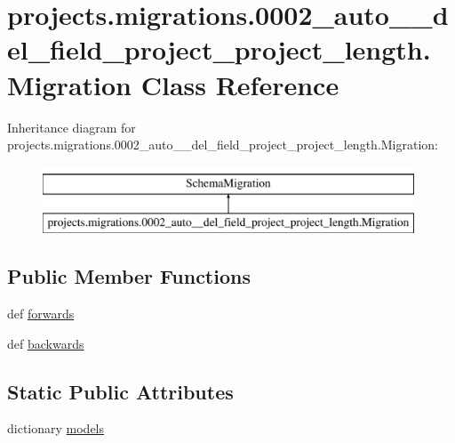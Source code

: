\hypertarget{classprojects_1_1migrations_1_10002__auto____del__field__project__project__length_1_1_migration}{\section{projects.\-migrations.0002\-\_\-auto\-\_\-\-\_\-del\-\_\-field\-\_\-project\-\_\-project\-\_\-length.Migration Class Reference}
\label{classprojects_1_1migrations_1_10002__auto____del__field__project__project__length_1_1_migration}
}
Inheritance diagram for projects.\-migrations.0002\-\_\-auto\-\_\-\-\_\-del\-\_\-field\-\_\-project\-\_\-project\-\_\-length.Migration\-:\begin{figure}[H]
\begin{center}
\leavevmode
\includegraphics[height=2.000000cm]{classprojects_1_1migrations_1_10002__auto____del__field__project__project__length_1_1_migration}
\end{center}
\end{figure}
\subsection*{Public Member Functions}
\begin{DoxyCompactItemize}
\item 
def \hyperlink{classprojects_1_1migrations_1_10002__auto____del__field__project__project__length_1_1_migration_a1d3e2f63bc9137cc188f692e344957a5}{forwards}
\item 
def \hyperlink{classprojects_1_1migrations_1_10002__auto____del__field__project__project__length_1_1_migration_a569f4e04a564a2be91d0ba528750e800}{backwards}
\end{DoxyCompactItemize}
\subsection*{Static Public Attributes}
\begin{DoxyCompactItemize}
\item 
dictionary \hyperlink{classprojects_1_1migrations_1_10002__auto____del__field__project__project__length_1_1_migration_a66226def0e035b84e7a51a6b4cc33954}{models}
\end{DoxyCompactItemize}


